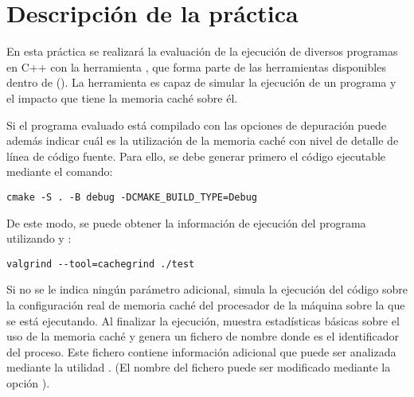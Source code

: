 \section{Descripción de la práctica}

En esta práctica se realizará la evaluación de la ejecución de diversos
programas en C++ con la herramienta , que forma parte de
las herramientas disponibles dentro de 
().  La herramienta es capaz de simular
la ejecución de un programa y el impacto que tiene la memoria caché sobre él. 

Si el programa evaluado está compilado con las opciones de depuración
 puede además
indicar cuál es la utilización de la memoria caché con nivel de detalle de
línea de código fuente.  Para ello, se debe generar primero el código
ejecutable mediante el comando:

\begin{lstlisting}[style=terminal,aboveskip=1em,belowskip=1em]
cmake -S . -B debug -DCMAKE_BUILD_TYPE=Debug
\end{lstlisting}

\vspace{1em}

De este modo, se puede obtener la información de ejecución del programa
utilizando  y :

\begin{lstlisting}[style=terminal,aboveskip=1em,belowskip=1em]
valgrind --tool=cachegrind ./test
\end{lstlisting}

\vspace{1em}

Si no se le indica ningún parámetro adicional,  simula
la ejecución del código sobre la configuración real de memoria caché del
procesador de la máquina sobre la que se está ejecutando. Al finalizar la
ejecución, muestra estadísticas básicas sobre el uso de la memoria caché y
genera un fichero de nombre  donde  es
el identificador del proceso. Este fichero contiene información adicional que
puede ser analizada mediante la utilidad . (El nombre del
fichero puede ser modificado mediante la opción
).

